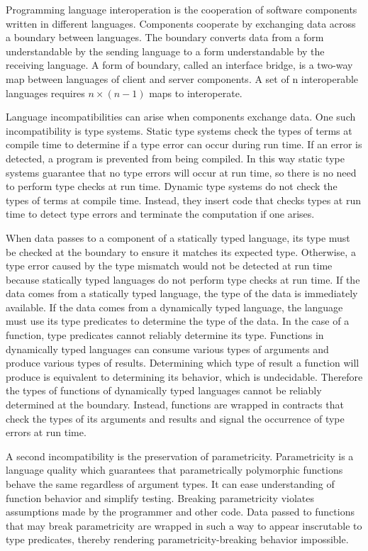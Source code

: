 Programming language interoperation is the cooperation of software components written in different languages.  Components cooperate by exchanging data across a boundary between languages.  The boundary converts data from a form understandable by the sending language to a form understandable by the receiving language.  A form of boundary, called an interface bridge, is a two-way map between languages of client and server components.  A set of n interoperable languages requires $n\times(n-1)$ maps to interoperate.

Language incompatibilities can arise when components exchange data.  One such incompatibility is type systems.  Static type systems check the types of terms at compile time to determine if a type error can occur during run time.  If an error is detected, a program is prevented from being compiled.  In this way static type systems guarantee that no type errors will occur at run time, so there is no need to perform type checks at run time.  Dynamic type systems do not check the types of terms at compile time.  Instead, they insert code that checks types at run time to detect type errors and terminate the computation if one arises.

When data passes to a component of a statically typed language, its type must be checked at the boundary to ensure it matches its expected type.  Otherwise, a type error caused by the type mismatch would not be detected at run time because statically typed languages do not perform type checks at run time.  If the data comes from a statically typed language, the type of the data is immediately available.  If the data comes from a dynamically typed language, the language must use its type predicates to determine the type of the data.  In the case of a function, type predicates cannot reliably determine its type.  Functions in dynamically typed languages can consume various types of arguments and produce various types of results.  Determining which type of result a function will produce is equivalent to determining its behavior, which is undecidable.  Therefore the types of functions of dynamically typed languages cannot be reliably determined at the boundary.  Instead, functions are wrapped in contracts that check the types of its arguments and results and signal the occurrence of type errors at run time.

A second incompatibility is the preservation of parametricity.  Parametricity is a language quality which guarantees that parametrically polymorphic functions behave the same regardless of argument types.  It can ease understanding of function behavior and simplify testing.  Breaking parametricity violates assumptions made by the programmer and other code.  Data passed to functions that may break parametricity are wrapped in such a way to appear inscrutable to type predicates, thereby rendering parametricity-breaking behavior impossible.

